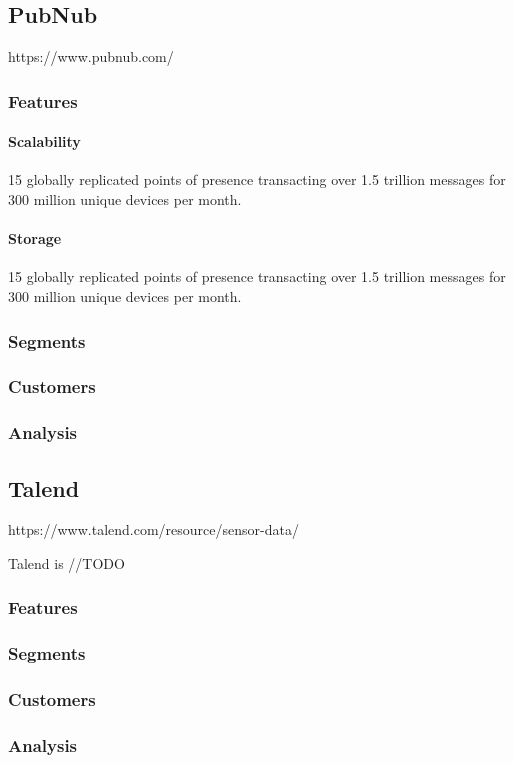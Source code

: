 \subsection{PubNub}\label{pubnub}

https://www.pubnub.com/

\subsubsection{Features}\label{features-1}

\paragraph{Scalability}\label{scalability}

15 globally replicated points of presence transacting over 1.5 trillion
messages for 300 million unique devices per month.

\paragraph{Storage}\label{storage}

15 globally replicated points of presence transacting over 1.5 trillion
messages for 300 million unique devices per month.

\subsubsection{Segments}\label{segments-1}

\subsubsection{Customers}\label{customers-1}

\subsubsection{Analysis}\label{analysis-1}

\subsection{Talend}\label{talend}

https://www.talend.com/resource/sensor-data/

Talend is //TODO

\subsubsection{Features}\label{features-2}

\subsubsection{Segments}\label{segments-2}

\subsubsection{Customers}\label{customers-2}

\subsubsection{Analysis}\label{analysis-2}
